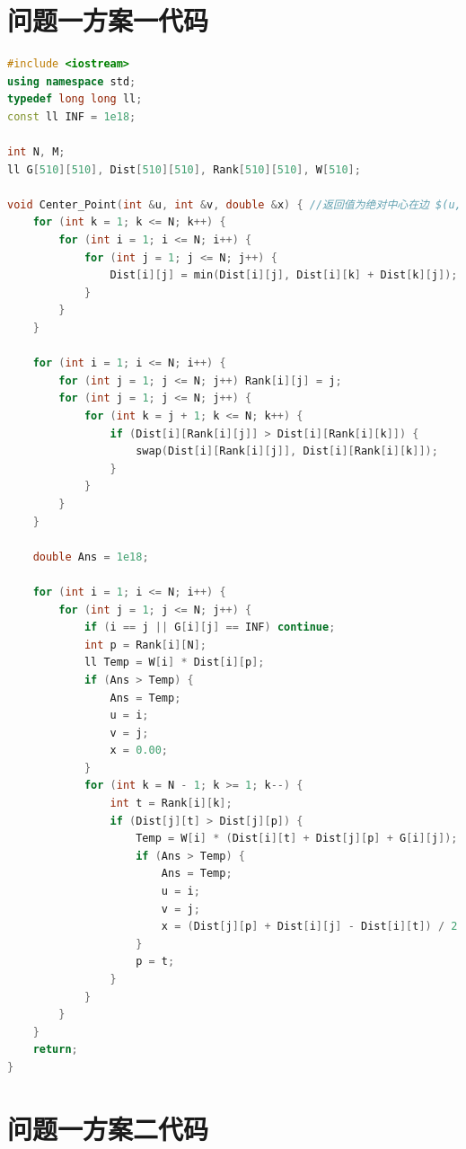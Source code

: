 \documentclass{cumcmthesis}
\begin{document}
\begin{appendices}


\section{问题一方案一代码}

\begin{lstlisting}[language=cpp]
#include <iostream>
using namespace std;
typedef long long ll;
const ll INF = 1e18;

int N, M;
ll G[510][510], Dist[510][510], Rank[510][510], W[510];

void Center_Point(int &u, int &v, double &x) { //返回值为绝对中心在边 $(u,v)$，与 $u$ 的距离为 $x$
    for (int k = 1; k <= N; k++) {
        for (int i = 1; i <= N; i++) {
            for (int j = 1; j <= N; j++) {
                Dist[i][j] = min(Dist[i][j], Dist[i][k] + Dist[k][j]);
            }
        }
    }

    for (int i = 1; i <= N; i++) {
        for (int j = 1; j <= N; j++) Rank[i][j] = j;
        for (int j = 1; j <= N; j++) {
            for (int k = j + 1; k <= N; k++) {
                if (Dist[i][Rank[i][j]] > Dist[i][Rank[i][k]]) {
                    swap(Dist[i][Rank[i][j]], Dist[i][Rank[i][k]]);
                }
            }
        }
    }

    double Ans = 1e18;

    for (int i = 1; i <= N; i++) {
        for (int j = 1; j <= N; j++) {
            if (i == j || G[i][j] == INF) continue;
            int p = Rank[i][N];
            ll Temp = W[i] * Dist[i][p];
            if (Ans > Temp) {
                Ans = Temp;
                u = i;
                v = j;
                x = 0.00;
            }
            for (int k = N - 1; k >= 1; k--) {
                int t = Rank[i][k];
                if (Dist[j][t] > Dist[j][p]) {
                    Temp = W[i] * (Dist[i][t] + Dist[j][p] + G[i][j]);
                    if (Ans > Temp) {
                        Ans = Temp;
                        u = i;
                        v = j;
                        x = (Dist[j][p] + Dist[i][j] - Dist[i][t]) / 2.00;
                    }
                    p = t;
                }
            }
        }
    }
    return;
}
\end{lstlisting}

\section{问题一方案二代码}


\end{appendices}
\end{document}
